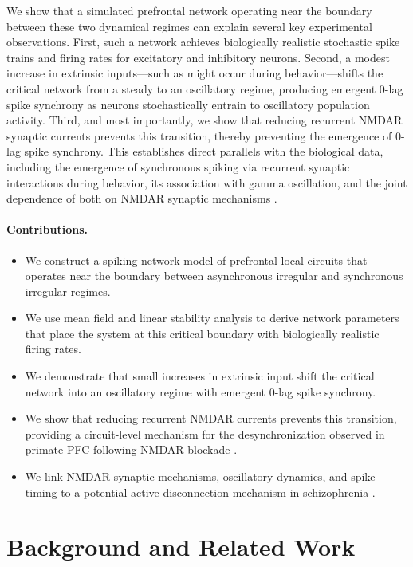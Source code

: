 We show that a simulated prefrontal network operating near the boundary between
these two dynamical regimes can explain several key experimental observations.
First, such a network achieves biologically realistic stochastic spike trains
and firing rates for excitatory and inhibitory neurons. Second, a modest
increase in extrinsic inputs---such as might occur during behavior---shifts
the critical network from a steady to an oscillatory regime, producing emergent
0-lag spike synchrony as neurons stochastically entrain to oscillatory
population activity. Third, and most importantly, we show that reducing
recurrent NMDAR synaptic currents prevents this transition, thereby preventing
the emergence of 0-lag spike synchrony. This establishes direct parallels with
the biological data, including the emergence of synchronous spiking via
recurrent synaptic interactions during behavior, its association with gamma
oscillation, and the joint dependence of both on NMDAR synaptic mechanisms
\citep{zick2018blocking}.

\paragraph{Contributions.}
\begin{itemize}
  \item We construct a spiking network model of prefrontal local circuits that
    operates near the boundary between asynchronous irregular and synchronous
    irregular regimes.
  \item We use mean field and linear stability analysis to derive network
    parameters that place the system at this critical boundary with
    biologically realistic firing rates.
  \item We demonstrate that small increases in extrinsic input shift the
    critical network into an oscillatory regime with emergent 0-lag spike
    synchrony.
  \item We show that reducing recurrent NMDAR currents prevents this
    transition, providing a circuit-level mechanism for the desynchronization
    observed in primate PFC following NMDAR blockade \citep{zick2018blocking}.
  \item We link NMDAR synaptic mechanisms, oscillatory dynamics, and spike
    timing to a potential active disconnection mechanism in schizophrenia
    \citep{dan2004spike, zick2021disparate}.
\end{itemize}

\section{Background and Related Work}

